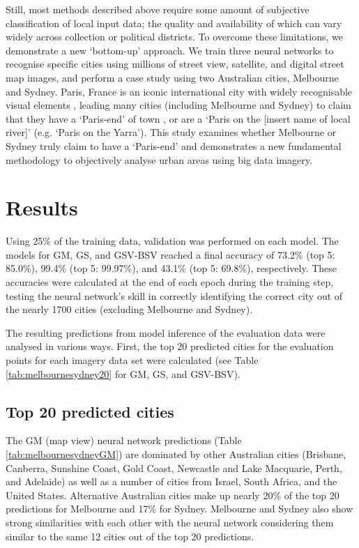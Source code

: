 \documentclass[urbansci,article,submit,moreauthors,pdftex]{Definitions/mdpi}
\begin{document}
Still, most methods described above require some amount of subjective classification of local input data; the quality and availability of which can vary widely across collection or political districts. To overcome these limitations, we demonstrate a new `bottom-up' approach. We train three neural networks to recognise specific cities using millions of street view, satellite, and digital street map images, and perform a case study using two Australian cities, Melbourne and Sydney. Paris, France is an iconic international city \citep{Anholt2006} with widely recognisable visual elements \citep{Doersch2012}, leading many cities (including Melbourne and Sydney) to claim that they have a `Paris-end' of town \citep{Williams2010}, or are a `Paris on the [insert name of local river]' \citep{Wilden2013} (e.g. `Paris on the Yarra'). This study examines whether Melbourne or Sydney truly claim to have a `Paris-end' and demonstrates a new fundamental methodology to objectively analyse urban areas using big data imagery.
 

\section{Results}\label{sec:results}

Using 25\% of the training data, validation was performed on each model. The models for GM, GS, and GSV-BSV reached a final accuracy of 73.2\% (top 5: 85.0\%), 99.4\% (top 5: 99.97\%), and 43.1\% (top 5: 69.8\%), respectively. These accuracies were calculated at the end of each epoch during the training step, testing the neural network's skill in correctly identifying the correct city out of the nearly 1700 cities (excluding Melbourne and Sydney).

The resulting predictions from model inference of the evaluation data were analysed in various ways. First, the top 20 predicted cities for the evaluation points for each imagery data set were calculated (see Table \ref{tab:melbournesydney20} for GM, GS, and GSV-BSV).

\subsection{Top 20 predicted cities} 

The GM (map view) neural network predictions (Table \ref{tab:melbournesydneyGM}) are dominated by other Australian cities (Brisbane, Canberra, Sunshine Coast, Gold Coast, Newcastle and Lake Macquarie, Perth, and Adelaide) as well as a number of cities from Israel, South Africa, and the United States. Alternative Australian cities make up nearly 20\% of the top 20 predictions for Melbourne and 17\% for Sydney. Melbourne and Sydney also show strong similarities with each other with the neural network considering them similar to the same 12 cities out of the top 20 predictions.
\end{document}
